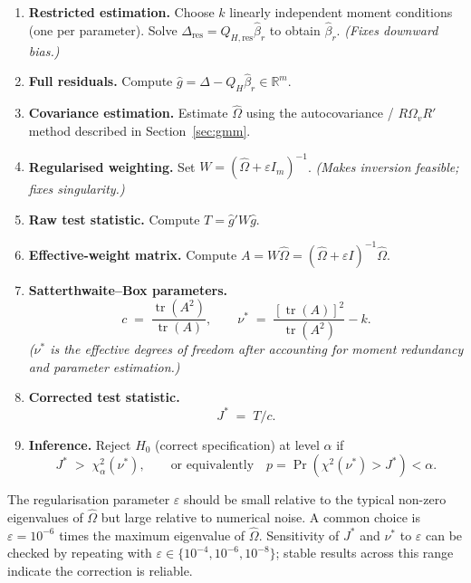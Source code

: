 \begin{enumerate}[label=\textbf{Step \arabic*.}, leftmargin=*, itemsep=4pt]

  \item \textbf{Restricted estimation.}
        Choose $k$ linearly independent moment conditions (one per
        parameter).  Solve $\Delta_{\mathrm{res}} =
        Q_{H,\mathrm{res}}\hat\beta_r$ to obtain $\hat\beta_r$.
        \emph{(Fixes downward bias.)}

  \item \textbf{Full residuals.}
        Compute $\hat g = \Delta - Q_H\hat\beta_r \in \mathbb{R}^m$.

  \item \textbf{Covariance estimation.}
        Estimate $\hat\Omega$ using the autocovariance / $R\Omega_v R'$
        method described in Section~\ref{sec:gmm}.

  \item \textbf{Regularised weighting.}
        Set $W = (\hat\Omega + \varepsilon I_m)^{-1}$.
        \emph{(Makes inversion feasible; fixes singularity.)}

  \item \textbf{Raw test statistic.}
        Compute $T = \hat g' W \hat g$.

  \item \textbf{Effective-weight matrix.}
        Compute $A = W\hat\Omega = (\hat\Omega+\varepsilon I)^{-1}\hat\Omega$.

  \item \textbf{Satterthwaite--Box parameters.}
        \[
          c \;=\; \frac{\operatorname{tr}(A^2)}{\operatorname{tr}(A)},
          \qquad
          \nu^* \;=\; \frac{[\operatorname{tr}(A)]^2}{\operatorname{tr}(A^2)} - k.
        \]
        \emph{($\nu^*$ is the effective degrees of freedom after
        accounting for moment redundancy and parameter estimation.)}

  \item \textbf{Corrected test statistic.}
        \[
          J^* \;=\; T/c.
        \]

  \item \textbf{Inference.}
        Reject $H_0$ (correct specification) at level $\alpha$ if
        \[
          J^* \;>\; \chi^2_\alpha(\nu^*),
          \qquad
          \text{or equivalently}\quad
          p = \Pr(\chi^2(\nu^*)>J^*) < \alpha.
        \]

\end{enumerate}

\medskip
\begin{tcolorbox}[colback=blue!5, colframe=blue!30,
  title=Practical note on $\varepsilon$]
The regularisation parameter $\varepsilon$ should be small relative to
the typical non-zero eigenvalues of $\hat\Omega$ but large relative to
numerical noise.  A common choice is $\varepsilon = 10^{-6}$ times
the maximum eigenvalue of $\hat\Omega$.  Sensitivity of $J^*$ and
$\nu^*$ to $\varepsilon$ can be checked by repeating with
$\varepsilon \in \{10^{-4}, 10^{-6}, 10^{-8}\}$; stable results across
this range indicate the correction is reliable.
\end{tcolorbox}
